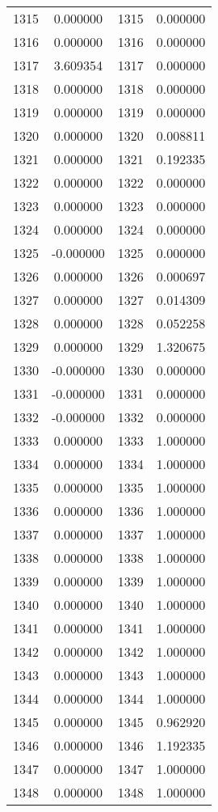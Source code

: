 \documentclass[12pt]{article}
\begin{document}
\begin{longtable}{@{}cccc@{}}
1315 & 0.000000 & 1315 & 0.000000 \\
1316 & 0.000000 & 1316 & 0.000000 \\
1317 & 3.609354 & 1317 & 0.000000 \\
1318 & 0.000000 & 1318 & 0.000000 \\
1319 & 0.000000 & 1319 & 0.000000 \\
1320 & 0.000000 & 1320 & 0.008811 \\
1321 & 0.000000 & 1321 & 0.192335 \\
1322 & 0.000000 & 1322 & 0.000000 \\
1323 & 0.000000 & 1323 & 0.000000 \\
1324 & 0.000000 & 1324 & 0.000000 \\
1325 & -0.000000 & 1325 & 0.000000 \\
1326 & 0.000000 & 1326 & 0.000697 \\
1327 & 0.000000 & 1327 & 0.014309 \\
1328 & 0.000000 & 1328 & 0.052258 \\
1329 & 0.000000 & 1329 & 1.320675 \\
1330 & -0.000000 & 1330 & 0.000000 \\
1331 & -0.000000 & 1331 & 0.000000 \\
1332 & -0.000000 & 1332 & 0.000000 \\
1333 & 0.000000 & 1333 & 1.000000 \\
1334 & 0.000000 & 1334 & 1.000000 \\
1335 & 0.000000 & 1335 & 1.000000 \\
1336 & 0.000000 & 1336 & 1.000000 \\
1337 & 0.000000 & 1337 & 1.000000 \\
1338 & 0.000000 & 1338 & 1.000000 \\
1339 & 0.000000 & 1339 & 1.000000 \\
1340 & 0.000000 & 1340 & 1.000000 \\
1341 & 0.000000 & 1341 & 1.000000 \\
1342 & 0.000000 & 1342 & 1.000000 \\
1343 & 0.000000 & 1343 & 1.000000 \\
1344 & 0.000000 & 1344 & 1.000000 \\
1345 & 0.000000 & 1345 & 0.962920 \\
1346 & 0.000000 & 1346 & 1.192335 \\
1347 & 0.000000 & 1347 & 1.000000 \\
1348 & 0.000000 & 1348 & 1.000000 \\

\end{longtable}
\end{document}
